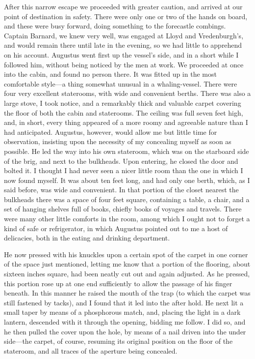 After this narrow escape we proceeded with greater caution, and arrived at
our point of destination in safety. There were only one or two of the hands on
board, and these were busy forward, doing something to the forecastle combings.
Captain Barnard, we knew very well, was engaged at Lloyd and Vredenburgh's, and
would remain there until late in the evening, so we had little to apprehend on
his account. Augustus went first up the vessel's side, and in a short while I
followed him, without being noticed by the men at work. We proceeded at once
into the cabin, and found no person there. It was fitted up in the most
comfortable style---a thing somewhat unusual in a whaling-vessel. There were
four very excellent staterooms, with wide and convenient berths. There was also
a large stove, I took notice, and a remarkably thick and valuable carpet
covering the floor of both the cabin and staterooms. The ceiling was full seven
feet high, and, in short, every thing appeared of a more roomy and agreeable
nature than I had anticipated. Augustus, however, would allow me but little time
for observation, insisting upon the necessity of my concealing myself as soon as
possible. He led the way into his own stateroom, which was on the starboard side
of the brig, and next to the bulkheads. Upon entering, he closed the door and
bolted it. I thought I had never seen a nicer little room than the one in which
I now found myself. It was about ten feet long, and had only one berth, which,
as I said before, was wide and convenient. In that portion of the closet nearest
the bulkheads there was a space of four feet square, containing a table, a
chair, and a set of hanging shelves full of books, chiefly books of voyages and
travels. There were many other little comforts in the room, among which I ought
not to forget a kind of safe or refrigerator, in which Augustus pointed out to
me a host of delicacies, both in the eating and drinking department. 

He now pressed with his knuckles upon a certain spot of the carpet in one
corner of the space just mentioned, letting me know that a portion of the
flooring, about sixteen inches square, had been neatly cut out and again
adjusted. As he pressed, this portion rose up at one end sufficiently to allow
the passage of his finger beneath. In this manner he raised the mouth of the
trap (to which the carpet was still fastened by tacks), and I found that it led
into the after hold. He next lit a small taper by means of a phosphorous match,
and, placing the light in a dark lantern, descended with it through the opening,
bidding me follow. I did so, and he then pulled the cover upon the hole, by
means of a nail driven into the under side---the carpet, of course, resuming its
original position on the floor of the stateroom, and all traces of the aperture
being concealed. 

